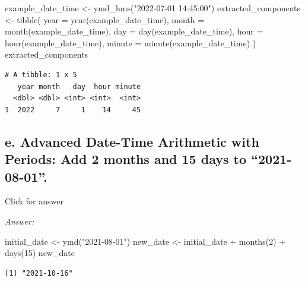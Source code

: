 \documentclass[
]{book}
\newenvironment{Shaded}{\begin{snugshade}}{\end{snugshade}}
\newcommand{\AttributeTok}[1]{\textcolor[rgb]{0.77,0.63,0.00}{#1}}
\newcommand{\DecValTok}[1]{\textcolor[rgb]{0.00,0.00,0.81}{#1}}
\newcommand{\FunctionTok}[1]{\textcolor[rgb]{0.00,0.00,0.00}{#1}}
\newcommand{\NormalTok}[1]{#1}
\newcommand{\OtherTok}[1]{\textcolor[rgb]{0.56,0.35,0.01}{#1}}
\newcommand{\SpecialCharTok}[1]{\textcolor[rgb]{0.00,0.00,0.00}{#1}}
\newcommand{\StringTok}[1]{\textcolor[rgb]{0.31,0.60,0.02}{#1}}
\begin{document}
\begin{Shaded}
\begin{Highlighting}[]
\NormalTok{example\_date\_time }\OtherTok{\textless{}{-}} \FunctionTok{ymd\_hms}\NormalTok{(}\StringTok{"2022{-}07{-}01 14:45:00"}\NormalTok{)}
\NormalTok{extracted\_components }\OtherTok{\textless{}{-}} \FunctionTok{tibble}\NormalTok{(}
  \AttributeTok{year =} \FunctionTok{year}\NormalTok{(example\_date\_time),}
  \AttributeTok{month =} \FunctionTok{month}\NormalTok{(example\_date\_time),}
  \AttributeTok{day =} \FunctionTok{day}\NormalTok{(example\_date\_time),}
  \AttributeTok{hour =} \FunctionTok{hour}\NormalTok{(example\_date\_time),}
  \AttributeTok{minute =} \FunctionTok{minute}\NormalTok{(example\_date\_time)}
\NormalTok{)}
\NormalTok{extracted\_components}
\end{Highlighting}
\end{Shaded}

\begin{verbatim}
# A tibble: 1 x 5
   year month   day  hour minute
  <dbl> <dbl> <int> <int>  <int>
1  2022     7     1    14     45
\end{verbatim}

\hypertarget{e.-advanced-date-time-arithmetic-with-periods-add-2-months-and-15-days-to-2021-08-01.}{%
\subsection{e. Advanced Date-Time Arithmetic with Periods: Add 2 months and 15 days to ``2021-08-01''.}\label{e.-advanced-date-time-arithmetic-with-periods-add-2-months-and-15-days-to-2021-08-01.}}

Click for answer

\emph{Answer:}

\begin{Shaded}
\begin{Highlighting}[]
\NormalTok{initial\_date }\OtherTok{\textless{}{-}} \FunctionTok{ymd}\NormalTok{(}\StringTok{"2021{-}08{-}01"}\NormalTok{)}
\NormalTok{new\_date }\OtherTok{\textless{}{-}}\NormalTok{ initial\_date }\SpecialCharTok{+} \FunctionTok{months}\NormalTok{(}\DecValTok{2}\NormalTok{) }\SpecialCharTok{+} \FunctionTok{days}\NormalTok{(}\DecValTok{15}\NormalTok{)}
\NormalTok{new\_date}
\end{Highlighting}
\end{Shaded}

\begin{verbatim}
[1] "2021-10-16"
\end{verbatim}
\end{document}
